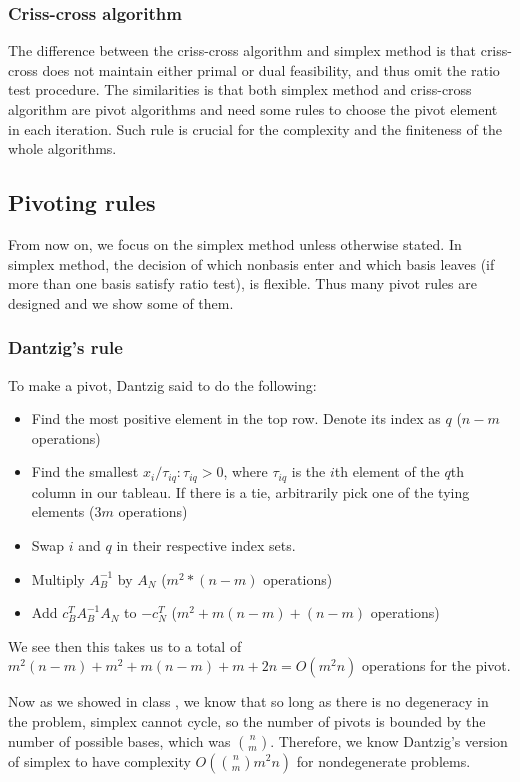 \documentclass[11pt]{article}
\begin{document}
\subsubsection{Criss-cross algorithm}
The difference between the criss-cross algorithm and simplex method is that criss-cross does not maintain either primal or dual feasibility, and thus omit the ratio test procedure. The similarities is that both simplex method and criss-cross algorithm are pivot algorithms and need some rules to choose the pivot element in each iteration. Such rule is crucial for the complexity and the finiteness of the whole algorithms. 
 
\subsection{Pivoting rules} \label{secpivotrules}
From now on, we focus on the simplex method unless otherwise stated. In simplex method, the decision of which nonbasis enter and which basis leaves (if more than one basis satisfy ratio test), is flexible. Thus many pivot rules are designed and we show some of them. 
\subsubsection{Dantzig's rule}
To make a pivot, Dantzig said to do the following:
\begin{itemize}
	\item Find the most positive element in the top row. Denote its index as $q$ ($n-m$ operations)
	\item Find the smallest $x_i/ \tau_{iq} : \tau_{iq} > 0$, where $\tau_{iq}$ is the $i$th element of the $q$th column in our tableau. If there is a tie, arbitrarily pick one of the tying elements ($3m$ operations)
	\item Swap $i$ and $q$ in their respective index sets.
	\item Multiply $A_B^{-1}$ by $A_N$ ($m^2*(n-m)$ operations)
	\item Add $c_B^T A_B^{-1} A_N$ to $-c_N^T$ ($m^2 + m(n-m) + (n-m)$ operations)
\end{itemize}
We see then this takes us to a total of $m^2 (n - m) + m^2 + m (n - m) + m + 2 n = O(m^2n)$ operations for the pivot.

Now as we showed in class \cite{class}, we know that so long as there is no degeneracy in the problem, simplex cannot cycle, so the number of pivots is bounded by the number of possible bases, which was $\binom{n}{m}$. Therefore, we know Dantzig's version of simplex to have complexity $O(\binom{n}{m}m^2n)$ for nondegenerate problems.
\end{document}
